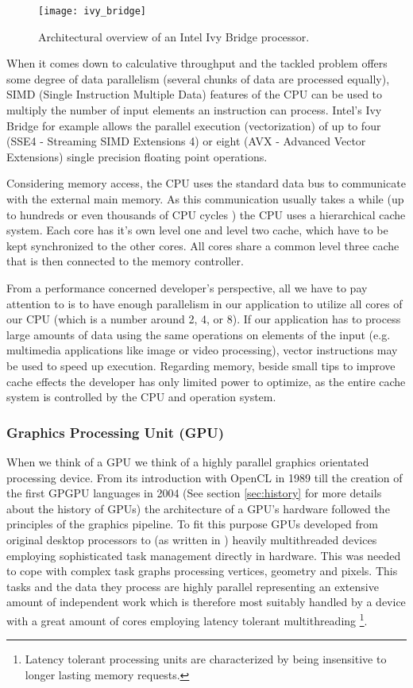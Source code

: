 \begin{figure}
\centering
\texttt{[image: ivy\_bridge]}
\caption{Architectural overview of an Intel Ivy Bridge processor. \cite{ivy_bridge}}
\label{fig:ivy_bridge}
\end{figure}

When it comes down to calculative throughput and the tackled problem offers some degree of data parallelism (several chunks of data are processed equally), SIMD (Single Instruction Multiple Data) features of the CPU can be used to multiply the number of input elements an instruction can process. Intel's Ivy Bridge for example allows the parallel execution (vectorization) of up to four (SSE4 - Streaming SIMD Extensions 4) or eight (AVX - Advanced Vector Extensions) single precision floating point operations.

Considering memory access, the CPU uses the standard data bus to communicate with the external main memory. As this communication usually takes a while (up to hundreds or even thousands of CPU cycles \cite[p.54]{opencl_book}) the CPU uses a hierarchical cache system. Each core has it's own level one and level two cache, which have to be kept synchronized to the other cores. All cores share a common level three cache that is then connected to the memory controller.

From a performance concerned developer's perspective, all we have to pay attention to is to have enough parallelism in our application to utilize all cores of our CPU (which is a number around 2, 4, or 8). If our application has to process large amounts of data using the same operations on elements of the input (e.g. multimedia applications like image or video processing), vector instructions may be used to speed up execution. Regarding memory, beside small tips to improve cache effects the developer has only limited power to optimize, as the entire cache system is controlled by the CPU and operation system. 


\subsubsection{Graphics Processing Unit (GPU)}

When we think of a GPU we think of a highly parallel graphics orientated processing device. From its introduction with OpenCL in 1989 till the creation of the first GPGPU languages in 2004 (See section \ref{sec:history} for more details about the history of GPUs) the architecture of a GPU's hardware followed the principles of the graphics pipeline. To fit this purpose GPUs developed from original desktop processors to (as written in \cite{opencl_book}) heavily multithreaded devices employing sophisticated task management directly in hardware. This was needed to cope with complex task graphs processing vertices, geometry and pixels. This tasks and the data they process are highly parallel representing an extensive amount of independent work which is therefore most suitably handled by a device with a great amount of cores employing latency tolerant multithreading \footnote{Latency tolerant processing units are characterized by being insensitive to longer lasting memory requests.}.

